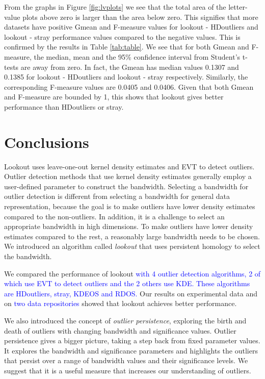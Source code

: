 \documentclass[12pt]{article}
\theoremstyle{definition}
\theoremstyle{definition}
\theoremstyle{definition}
\theoremstyle{remark}
\begin{document}
From the graphs in Figure \ref{fig:lvplots} we see that the total area of the letter-value plots above zero is larger than the area below zero. This signifies that more datasets have positive Gmean and F-measure values for lookout - HDoutliers and lookout - stray performance values compared to the negative values. This is confirmed by the results in Table \ref{tab:table}. We see that for both Gmean and F-measure, the median, mean and the 95\% confidence interval from Student's t-tests are away from zero. In fact, the Gmean has median values 0.1307 and 0.1385 for lookout - HDoutliers and lookout - stray respectively. Similarly, the corresponding F-measure values are 0.0405 and 0.0406. Given that both Gmean and F-measure are bounded by 1, this shows that lookout gives better performance than HDoutliers or stray.

\hypertarget{sec:conclusions}{%
\section{Conclusions}\label{sec:conclusions}}

Lookout uses leave-one-out kernel density estimates and EVT to detect outliers. Outlier detection methods that use kernel density estimates generally employ a user-defined parameter to construct the bandwidth. Selecting a bandwidth for outlier detection is different from selecting a bandwidth for general data representation, because the goal is to make outliers have lower density estimates compared to the non-outliers. In addition, it is a challenge to select an appropriate bandwidth in high dimensions. To make outliers have lower density estimates compared to the rest, a reasonably large bandwidth needs to be chosen. We introduced an algorithm called \emph{lookout} that uses persistent homology to select the bandwidth.

We compared the performance of lookout \textcolor{blue}{with 4 outlier detection algorithms, 2 of which use EVT to detect outliers and the 2 others use KDE. These algorithms are HDoutliers, stray, KDEOS and RDOS.} Our results on experimental data and on \textcolor{blue}{two data repositories} showed that lookout achieves better performance.

We also introduced the concept of \emph{outlier persistence}, exploring the birth and death of outliers with changing bandwidth and significance values. Outlier persistence gives a bigger picture, taking a step back from fixed parameter values. It explores the bandwidth and significance parameters and highlights the outliers that persist over a range of bandwidth values and their significance levels. We suggest that it is a useful measure that increases our understanding of outliers.
\end{document}
